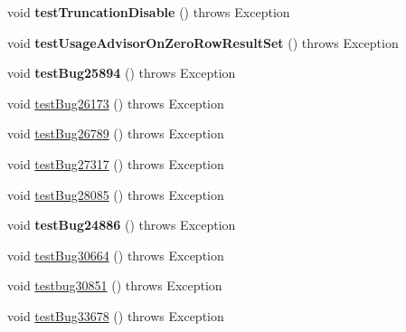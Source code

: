 \begin{DoxyCompactItemize}
\item 
\mbox{\label{classtestsuite_1_1regression_1_1_result_set_regression_test_ad69ed75a3e108acae96519abfdfd6de6}} 
void {\bfseries test\+Truncation\+Disable} ()  throws Exception 
\item 
\mbox{\label{classtestsuite_1_1regression_1_1_result_set_regression_test_a9a179a9951b69e2e8b0d914aef3ac482}} 
void {\bfseries test\+Usage\+Advisor\+On\+Zero\+Row\+Result\+Set} ()  throws Exception 
\item 
\mbox{\label{classtestsuite_1_1regression_1_1_result_set_regression_test_ae96bf431292ca3dc0ee61559038d7cf0}} 
void {\bfseries test\+Bug25894} ()  throws Exception 
\item 
void \mbox{\hyperlink{classtestsuite_1_1regression_1_1_result_set_regression_test_afa0bbccee8e4bffb0576ef3c0cd096f0}{test\+Bug26173}} ()  throws Exception 
\item 
void \mbox{\hyperlink{classtestsuite_1_1regression_1_1_result_set_regression_test_a025d8f10b5713673139e324fd77a7482}{test\+Bug26789}} ()  throws Exception 
\item 
void \mbox{\hyperlink{classtestsuite_1_1regression_1_1_result_set_regression_test_af045c2d205dada239fec239d477c2563}{test\+Bug27317}} ()  throws Exception 
\item 
void \mbox{\hyperlink{classtestsuite_1_1regression_1_1_result_set_regression_test_a85ca3f94b415a4fd27c69354a16eb5e5}{test\+Bug28085}} ()  throws Exception 
\item 
\mbox{\label{classtestsuite_1_1regression_1_1_result_set_regression_test_a522f309cdbf6fcb9faa3607bece129a2}} 
void {\bfseries test\+Bug24886} ()  throws Exception 
\item 
void \mbox{\hyperlink{classtestsuite_1_1regression_1_1_result_set_regression_test_a4a7f176d9e3539b3acd902e97e904e17}{test\+Bug30664}} ()  throws Exception 
\item 
void \mbox{\hyperlink{classtestsuite_1_1regression_1_1_result_set_regression_test_af0003fc9fd4769efb8aac00270eeec6f}{testbug30851}} ()  throws Exception 
\item 
void \mbox{\hyperlink{classtestsuite_1_1regression_1_1_result_set_regression_test_a6f45076cd422b1dadc631967a3520dbd}{test\+Bug33678}} ()  throws Exception 

\end{DoxyCompactItemize}
